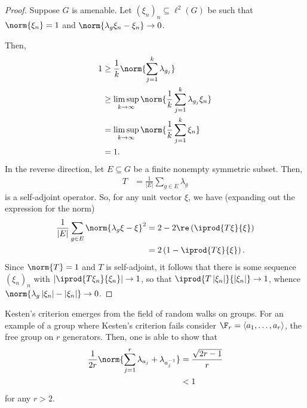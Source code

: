 \documentclass[10pt]{mypackage}
\begin{document}
\begin{proof}
  Suppose $G$ is amenable. Let $\left( \xi_n \right)_{n}\subseteq \ell^2\left( G \right)$ be such that $\norm{\xi_n} = 1$ and $\norm{\lambda_g\xi_n-\xi_n} \to 0$.

  Then,
  \begin{align*}
    1 &\geq \frac{1}{k}\norm{\sum_{j=1}^{k}\lambda_{g_j}}\\
      &\geq \limsup_{k\to\infty}\norm{\frac{1}{k}\sum_{j=1}^{k}\lambda_{g_j}\xi_n}\\
      &= \limsup_{k\to\infty} \norm{\frac{1}{k}\sum_{j=1}^{k}\xi_n}\\
      &= 1.
  \end{align*}
  In the reverse direction, let $E\subseteq G$ be a finite nonempty symmetric subset. Then,
  \begin{align*}
    T &= \frac{1}{\left\vert E \right\vert}\sum_{g\in E}\lambda_g
  \end{align*}
  is a self-adjoint operator. So, for any unit vector $\xi$, we have (expanding out the expression for the norm)
  \begin{align*}
\frac{1}{\left\vert E \right\vert}\sum_{g\in E}\norm{\lambda_g\xi-\xi}^2 &= 2-2\re\left( \iprod{T\xi}{\xi} \right)\\
                                                                         &= 2\left( 1- \iprod{T\xi}{\xi} \right).
  \end{align*}
  Since $\norm{T} = 1$ and $T$ is self-adjoint, it follows that there is some sequence $\left( \xi_n \right)_{n}$ with $ \left\vert \iprod{T\xi_n}{\xi_n} \right\vert \to 1$, so that $ \iprod{T\left\vert \xi_n \right\vert}{\left\vert \xi_n \right\vert} \to 1 $, whence $ \norm{\lambda_g \left\vert \xi_n \right\vert - \left\vert \xi_n \right\vert}\to 0 $.
\end{proof}
Kesten's criterion emerges from the field of random walks on groups. For an example of a group where Kesten's criterion fails consider $\F_r = \left\langle a_1,\dots,a_r \right\rangle$, the free group on $r$ generators. Then, one is able to show that
\begin{align*}
  \frac{1}{2r} \norm{\sum_{j=1}^{r}\lambda_{a_j} + \lambda_{a_j^{-1}}} &= \frac{\sqrt{2r-1}}{r}\\
                                                                       &< 1
\end{align*}
for any $r > 2$.
\end{document}
